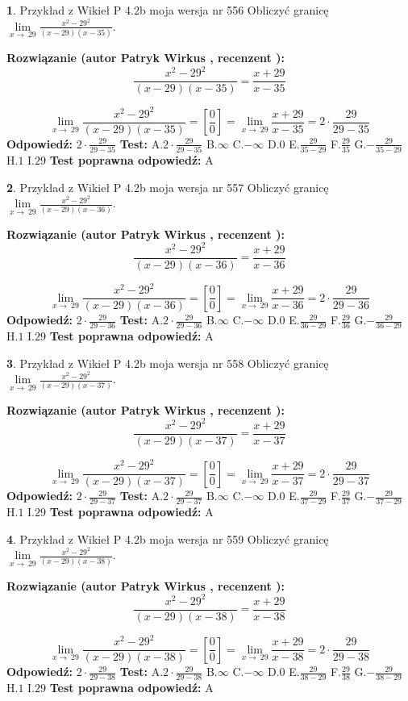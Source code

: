 \documentclass[12pt, a4paper]{article}
\theoremstyle{definition} %
\newtheorem{zad}{}
\newcommand{\zadStart}[1]{\begin{zad}#1\newline}
\newcommand{\zadStop}{\end{zad}}
\newcommand{\rozwStart}[2]{\noindent \textbf{Rozwiązanie (autor #1 , recenzent #2): }\newline}
\newcommand{\rozwStop}{\newline}
\newcommand{\odpStart}{\noindent \textbf{Odpowiedź:}\newline}
\newcommand{\odpStop}{\newline}
\newcommand{\testStart}{\noindent \textbf{Test:}\newline}
\newcommand{\testStop}{\newline}
\newcommand{\kluczStart}{\noindent \textbf{Test poprawna odpowiedź:}\newline}
\newcommand{\kluczStop}{\newline}
\begin{document}
\zadStart{Przykład z Wikieł P 4.2b moja wersja nr 556}
Obliczyć granicę $\lim\limits_{x\to\ 29}\frac{x^{2}-29^{2}}{(x-29)(x-35)}$.
\zadStop
\rozwStart{Patryk Wirkus}{}
$$\frac{x^{2}-29^{2}}{(x-29)(x-35)}=\frac{x+29}{x-35}$$

$$\lim\limits_{x\to\ 29}\frac{x^{2}-29^{2}}{(x-29)(x-35)}=[\frac{0}{0}]=\lim\limits_{x\to\ 29}\frac{x+29}{x-35}=2 \cdot \frac{29}{29-35}$$
\rozwStop
\odpStart
$2 \cdot \frac{29}{29-35}$
\odpStop
\testStart
A.$2 \cdot \frac{29}{29-35}$
B.$\infty$
C.$-\infty$
D.$0$
E.$\frac{29}{35-29}$
F.$\frac{29}{35}$
G.$-\frac{29}{35-29}$
H.$1$
I.$29$
\testStop
\kluczStart
A
\kluczStop



\zadStart{Przykład z Wikieł P 4.2b moja wersja nr 557}
Obliczyć granicę $\lim\limits_{x\to\ 29}\frac{x^{2}-29^{2}}{(x-29)(x-36)}$.
\zadStop
\rozwStart{Patryk Wirkus}{}
$$\frac{x^{2}-29^{2}}{(x-29)(x-36)}=\frac{x+29}{x-36}$$

$$\lim\limits_{x\to\ 29}\frac{x^{2}-29^{2}}{(x-29)(x-36)}=[\frac{0}{0}]=\lim\limits_{x\to\ 29}\frac{x+29}{x-36}=2 \cdot \frac{29}{29-36}$$
\rozwStop
\odpStart
$2 \cdot \frac{29}{29-36}$
\odpStop
\testStart
A.$2 \cdot \frac{29}{29-36}$
B.$\infty$
C.$-\infty$
D.$0$
E.$\frac{29}{36-29}$
F.$\frac{29}{36}$
G.$-\frac{29}{36-29}$
H.$1$
I.$29$
\testStop
\kluczStart
A
\kluczStop



\zadStart{Przykład z Wikieł P 4.2b moja wersja nr 558}
Obliczyć granicę $\lim\limits_{x\to\ 29}\frac{x^{2}-29^{2}}{(x-29)(x-37)}$.
\zadStop
\rozwStart{Patryk Wirkus}{}
$$\frac{x^{2}-29^{2}}{(x-29)(x-37)}=\frac{x+29}{x-37}$$

$$\lim\limits_{x\to\ 29}\frac{x^{2}-29^{2}}{(x-29)(x-37)}=[\frac{0}{0}]=\lim\limits_{x\to\ 29}\frac{x+29}{x-37}=2 \cdot \frac{29}{29-37}$$
\rozwStop
\odpStart
$2 \cdot \frac{29}{29-37}$
\odpStop
\testStart
A.$2 \cdot \frac{29}{29-37}$
B.$\infty$
C.$-\infty$
D.$0$
E.$\frac{29}{37-29}$
F.$\frac{29}{37}$
G.$-\frac{29}{37-29}$
H.$1$
I.$29$
\testStop
\kluczStart
A
\kluczStop



\zadStart{Przykład z Wikieł P 4.2b moja wersja nr 559}
Obliczyć granicę $\lim\limits_{x\to\ 29}\frac{x^{2}-29^{2}}{(x-29)(x-38)}$.
\zadStop
\rozwStart{Patryk Wirkus}{}
$$\frac{x^{2}-29^{2}}{(x-29)(x-38)}=\frac{x+29}{x-38}$$

$$\lim\limits_{x\to\ 29}\frac{x^{2}-29^{2}}{(x-29)(x-38)}=[\frac{0}{0}]=\lim\limits_{x\to\ 29}\frac{x+29}{x-38}=2 \cdot \frac{29}{29-38}$$
\rozwStop
\odpStart
$2 \cdot \frac{29}{29-38}$
\odpStop
\testStart
A.$2 \cdot \frac{29}{29-38}$
B.$\infty$
C.$-\infty$
D.$0$
E.$\frac{29}{38-29}$
F.$\frac{29}{38}$
G.$-\frac{29}{38-29}$
H.$1$
I.$29$
\testStop
\kluczStart
A
\kluczStop
\end{document}
